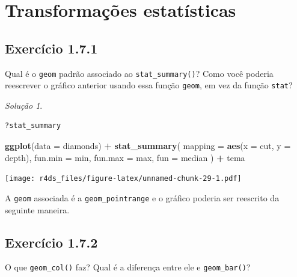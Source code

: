 \documentclass[
]{latex/krantz}
\newenvironment{Shaded}{\begin{snugshade}}{\end{snugshade}}
\newcommand{\AttributeTok}[1]{\textcolor[rgb]{0.13,0.29,0.53}{#1}}
\newcommand{\FunctionTok}[1]{\textcolor[rgb]{0.13,0.29,0.53}{\textbf{#1}}}
\newcommand{\NormalTok}[1]{#1}
\newcommand{\SpecialCharTok}[1]{\textcolor[rgb]{0.81,0.36,0.00}{\textbf{#1}}}
\theoremstyle{definition}
\theoremstyle{definition}
\theoremstyle{definition}
\theoremstyle{definition}
\theoremstyle{remark}
\newtheorem*{solution}{Solução}
\begin{document}
\hypertarget{transformauxe7uxf5es-estatuxedsticas}{%
\section{Transformações estatísticas}\label{transformauxe7uxf5es-estatuxedsticas}}

\hypertarget{exr1-7-1}{%
\subsection*{Exercício 1.7.1}\label{exr1-7-1}}

Qual é o \texttt{geom} padrão associado ao \texttt{stat\_summary()}? Como você poderia reescrever o gráfico anterior usando essa função \texttt{geom}, em vez da função \texttt{stat}?

\begin{solution}
\leavevmode

\begin{verbatim}
?stat_summary
\end{verbatim}

\begin{Shaded}
\begin{Highlighting}[]
\FunctionTok{ggplot}\NormalTok{(}\AttributeTok{data =}\NormalTok{ diamonds) }\SpecialCharTok{+}
    \FunctionTok{stat\_summary}\NormalTok{(}
        \AttributeTok{mapping =} \FunctionTok{aes}\NormalTok{(}\AttributeTok{x =}\NormalTok{ cut, }\AttributeTok{y =}\NormalTok{ depth),}
        \AttributeTok{fun.min =}\NormalTok{ min,}
        \AttributeTok{fun.max =}\NormalTok{ max,}
        \AttributeTok{fun =}\NormalTok{ median}
\NormalTok{    ) }\SpecialCharTok{+}
\NormalTok{    tema}
\end{Highlighting}
\end{Shaded}

\texttt{[image: r4ds\_files/figure-latex/unnamed-chunk-29-1.pdf]}

A \texttt{geom} associada é a \texttt{geom\_pointrange} e o gráfico poderia ser reescrito da seguinte maneira.

\end{solution}

\hypertarget{exr1-7-2}{%
\subsection*{Exercício 1.7.2}\label{exr1-7-2}}

O que \texttt{geom\_col()} faz? Qual é a diferença entre ele e \texttt{geom\_bar()}?
\end{document}
